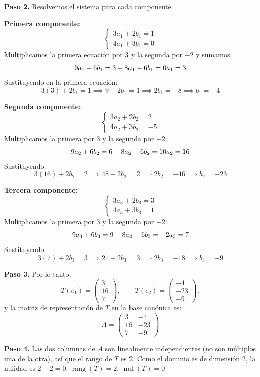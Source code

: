 \begin{prob}
\begin{myproof}
\textbf{Paso 2.} Resolvemos el sistema para cada componente.

\textbf{Primera componente:}
\[
\begin{cases}
3a_1 + 2b_1 = 1 \\
4a_1 + 3b_1 = 0
\end{cases}
\]
Multiplicamos la primera ecuación por $3$ y la segunda por $-2$ y sumamos:
\[
9a_1 + 6b_1 = 3 \\
-8a_1 - 6b_1 = 0 \\
a_1 = 3
\]
Sustituyendo en la primera ecuación:
\[
3(3) + 2b_1 = 1 \implies 9 + 2b_1 = 1 \implies 2b_1 = -8 \implies b_1 = -4
\]

\textbf{Segunda componente:}
\[
\begin{cases}
3a_2 + 2b_2 = 2 \\
4a_2 + 3b_2 = -5
\end{cases}
\]
Multiplicamos la primera por $3$ y la segunda por $-2$:
\[
9a_2 + 6b_2 = 6 \\
-8a_2 - 6b_2 = 10 \\
a_2 = 16
\]
Sustituyendo:
\[
3(16) + 2b_2 = 2 \implies 48 + 2b_2 = 2 \implies 2b_2 = -46 \implies b_2 = -23
\]

\textbf{Tercera componente:}
\[
\begin{cases}
3a_3 + 2b_3 = 3 \\
4a_3 + 3b_3 = 1
\end{cases}
\]
Multiplicamos la primera por $3$ y la segunda por $-2$:
\[
9a_3 + 6b_3 = 9 \\
-8a_3 - 6b_3 = -2 \\
a_3 = 7
\]
Sustituyendo:
\[
3(7) + 2b_3 = 3 \implies 21 + 2b_3 = 3 \implies 2b_3 = -18 \implies b_3 = -9
\]

\textbf{Paso 3.} Por lo tanto,
\[
T(e_1) = \begin{pmatrix} 3 \\ 16 \\ 7 \end{pmatrix}, \qquad T(e_2) = \begin{pmatrix} -4 \\ -23 \\ -9 \end{pmatrix},
\]
y la matriz de representación de $T$ en la base canónica es:
\[
\boxed{A = \begin{pmatrix}
3 & -4 \\
16 & -23 \\
7 & -9
\end{pmatrix}}
\]

\textbf{Paso 4.} Las dos columnas de $A$ son linealmente independientes (no son múltiplos una de la otra), así que el rango de $T$ es $2$. Como el dominio es de dimensión $2$, la nulidad es $2 - 2 = 0$. $\boxed{\operatorname{rang}(T)=2,\ \operatorname{nul}(T)=0}$
\end{myproof}
\end{prob}

